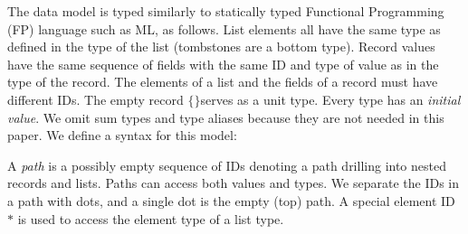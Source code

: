 \documentclass[english,submission]{programming}
\theoremstyle{definition}
\newtheorem*{remark}{Remark}
\newcommand{\mathbox}[1]{\colorbox{black!10}{$#1$}}
\newcommand{\is}{{:}\ }
\newcommand{\emptystring}{\textsf{\textquotedbl\ \!\textquotedbl}}
\begin{document}

The data model is typed similarly to statically typed Functional Programming (FP) language such as ML, as follows. List elements all have the same type as defined in the type of the list (tombstones are a bottom type). Record values have the same sequence of fields with the same ID and type of value as in the type of the record. The elements of a list and the fields of a record must have different IDs.
The empty record \mathbox{\text{\{\}}}serves as a unit type. Every type has an \textit{initial value}.
We omit sum types and type aliases because they are not needed in this paper.
We define a syntax for this model:

\tcbox{
\[ \begin{array}{r@{\ }l|r@{\ }l|r@{\ }l|l}
  \multicolumn{2}{l|}{\textrm{type}} & \multicolumn{2}{l|}{\textrm{value}} & \multicolumn{2}{l|}{\textrm{initial value}}&\\
  \hline
  T \Coloneqq & & v \Coloneqq & & T^\varnothing = & &\\
  &  \textsf{String} & & S & & \emptystring & \textrm{string}\\
  & \textsf{Number} & &  N & & \textsf{NaN} & \textrm{number}\\
  & \textsf{List } T & & [ E \is v \  \dots ] & & [] & \textrm{list}\\
  & \{ F \  S \is T \  \dots \} & & \{ F \is v \  \dots \} & & \{ F \is T^\varnothing \  \dots \}& \textrm{record}\\

  & \bot && \bigtimes & & \bigtimes & \textrm{tombstone}\\
\end{array}\]
}

A \textit{path} is a possibly empty sequence of IDs denoting a path drilling into nested records and lists. Paths can access both values and types. We separate the IDs in a path with dots, and a single dot is the empty (top) path. A special element ID~\mathbox{*} is used to access the element type of a list type.
\end{document}
